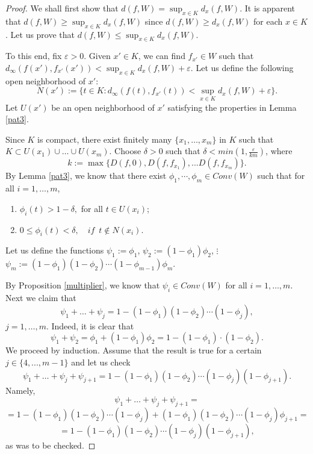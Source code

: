 \documentclass[12pt]{amsart}
\begin{document}
\begin{proof}
We shall first show that $d(f,W)=\sup_{x\in K}d_x(f,W)$. It is apparent that $d(f,W)\ge \sup_{x\in K}d_x(f,W)$ since $d(f,W)\ge d_x(f,W)$ for each $x\in K$.
Let us prove that $d(f,W)\le \sup_{x\in K}d_x(f,W)$.

To this end, fix $\varepsilon > 0$. Given $x'\in K$, we can find $f_{x'}\in W$ such that $d_{\infty}(f(x'),f_{x'}(x'))<\sup_{x\in K}d_x(f,W)+\varepsilon$.
Let us define the following open neighborhood of $x'$:
$$N(x'):= \{ t \in K: d_\infty (f(t), f_{x'}(t)) < \sup_{x\in K}d_x(f,W)+\varepsilon \}.$$
Let  $U(x')$ be an open neighborhood of $x'$ satisfying the properties in Lemma \ref{pat3}.


Since $K$ is compact, there exist finitely many $\{ x_1,	\ldots , x_m \}$ in $K$ such that $K \subset U(x_1) \cup \ldots \cup U(x_m)$.
Choose $\delta>0$ such that $\delta<min(1, \frac{\varepsilon}{km})$, where
\[k:=\max \{D(f,0), D(f, f_{x_1}),...D(f, f_{x_m})\}.\]
By Lemma \ref{pat3}, we know that there exist $\phi_1, \cdots, \phi_m \in Conv(W)$ such that for all $i=1, \ldots, m$,
\begin{enumerate}
\item[(i)] $\phi_i (t) > 1 - \delta,$ for all $t \in U(x_i)$;
\item[(ii)] $0 \le \phi_i (t) < \delta,\quad if  \enspace  t \notin N(x_i)$.
\end{enumerate}

Let us define the functions
\newline
$\psi_1 := \phi_1$,
\newline
$\psi_2 := ( 1 - \phi_1) \phi_2$,
\newline
$\vdots$
\newline
$\psi_m := ( 1 - \phi_1)( 1 - \phi_2) \cdots ( 1 - \phi_{m-1}) \phi_{m}$.

By Proposition \ref{multiplier}, we know that $\psi_i \in Conv(W)$ for all $i=1,\ldots,m$.
Next we claim that
$$\psi_1+\ldots+\psi_j= 1 - ( 1 - \phi_1)( 1 - \phi_2) \cdots ( 1 - \phi_j),$$ $j=1,\ldots,m .$
Indeed, it is clear that
$$\psi_1 + \psi_2 = \phi_1  + (1 - \phi_1) \phi_2= 1-(1-\phi_1)\cdot(1-\phi_2).$$
We proceed by induction. Assume that the result is true for a certain $j\in\{4,...,m-1\}$ and let us check
$$\psi_1+\ldots+\psi_j+\psi_{j+1}= 1 - ( 1 - \phi_1)( 1 - \phi_2) \cdots ( 1 - \phi_j) ( 1 - \phi_{j+1}).$$
Namely,
$$\psi_1+\ldots+\psi_j+\psi_{j+1}=$$
$$=1 - ( 1 - \phi_1)( 1 - \phi_2) \cdots ( 1 - \phi_j)+( 1 - \phi_1)( 1 - \phi_2) \cdots ( 1 - \phi_{j}) \phi_{j+1}=$$
$$=1 - ( 1 - \phi_1)( 1 - \phi_2) \cdots ( 1 - \phi_j) ( 1 - \phi_{j+1}),$$
as was to be checked.


\end{proof}
\end{document}
